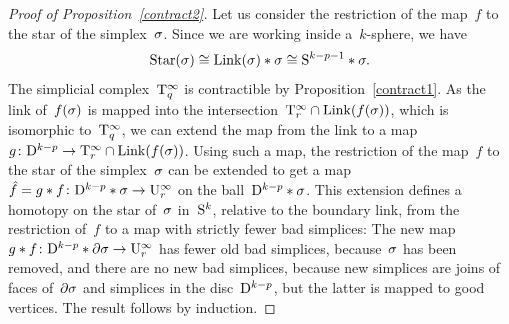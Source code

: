 \begin{proof}[Proof of Proposition~\ref{contract2}]
Let us consider the restriction of the map~$f$ to the star of the simplex~$\sigma$. Since we are working inside a~$k$-sphere, we have
\[
\operatorname{Star}(\sigma)\cong\operatorname{Link}(\sigma)*\sigma\cong \mathrm{S}^{k-p-1}*\sigma.
\]
The simplicial complex~$\mathrm{T}_{q}^\infty$ is contractible by Proposition~\ref{contract1}. As the link of~$f(\sigma)$ is mapped into the intersection~\hbox{$\mathrm{T}_r^\infty\cap\operatorname{Link}(f(\sigma))$}, which is isomorphic to~$\mathrm{T}_q^\infty$, we can extend the map from the link to a map~\hbox{$g\colon\mathrm{D}^{k-p}\to \mathrm{T}_r^\infty\cap\operatorname{Link}(f(\sigma))$}. 
Using such a map, the restriction of the map~$f$ to the star of the simplex~$\sigma$ can be extended to get a map~\hbox{$\hat f=g*f\colon\mathrm{D}^{k-p}*\sigma\to\mathrm{U}_r^\infty$} on the ball~$\mathrm{D}^{k-p}*\sigma$. 
This extension defines a homotopy on the star of~$\sigma$ in~$\mathrm{S}^k$, relative to the boundary link, from the restriction of~$f$ to a map with strictly fewer bad simplices: 
The new map~$g*f\colon\mathrm{D}^{k-p}*\partial\sigma\to\mathrm{U}_r^\infty$ has fewer old bad simplices, because~$\sigma$ has been removed, and 
there are no new bad simplices, because new simplices are joins of faces of~$\partial\sigma$ and simplices in the disc~$\mathrm{D}^{k-p}$, but the latter is mapped to good vertices. The result follows by induction.  
\end{proof}


